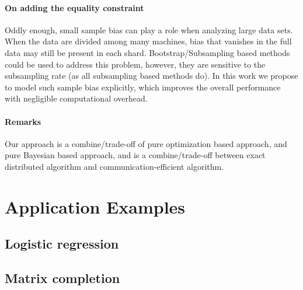 \documentclass{article}
\newcommand{\1}[0]{\ensuremath{\boldsymbol{1}}\xspace}
\begin{document}
\paragraph{On adding the equality constraint} Oddly enough, small sample bias can play a role when analyzing large data sets. When the data are divided among many machines, bias that vanishes in the full data may still be present in each shard. Bootstrap/Subsampling based methods could be used to address this problem, however, they are sensitive to the subsampling rate (as all subsampling based methods do). In this work we propose to model such sample bias explicitly, which improves the overall performance with negligible computational overhead.
\paragraph{Remarks} Our approach is a combine/trade-off of pure optimization based approach, and pure Bayesian based approach, and is a combine/trade-off between exact distributed algorithm and communication-efficient algorithm.



\section{Application Examples}
\subsection{Logistic regression}

\subsection{Matrix completion}


\nocite{langley00}



\end{document}
